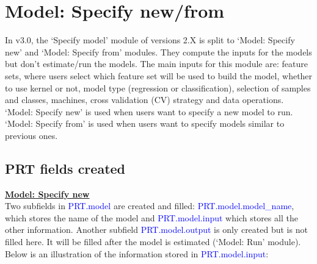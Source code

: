 



\section{Model: Specify new/from}

In v3.0, the `Specify model' module of versions 2.X is split to `Model: Specify new' and `Model: Specify from' modules. They compute the inputs for the models but don't estimate/run the models. The main inputs for this module are: feature sets, where users select which feature set will be used to build the model, whether to use kernel or not, model type (regression or classification), selection of samples and classes, machines, cross validation (CV) strategy and data operations. `Model: Specify new' is used when users want to specify a new model to run. `Model: Specify from' is used when users want to specify models similar to previous ones.

\subsection{PRT fields created}

\textbf{\underline{Model: Specify new}}
\\

Two subfields in \textcolor{blue}{PRT.model} are created and filled: \textcolor{blue}{PRT.model.model\_name}, which stores the name of the model and \textcolor{blue}{PRT.model.input} which stores all the other information. Another subfield \textcolor{blue}{PRT.model.output} is only created but is not filled here. It will be filled after the model is estimated (`Model: Run' module). Below is an illustration of the information stored in \textcolor{blue}{PRT.model.input}:
 
